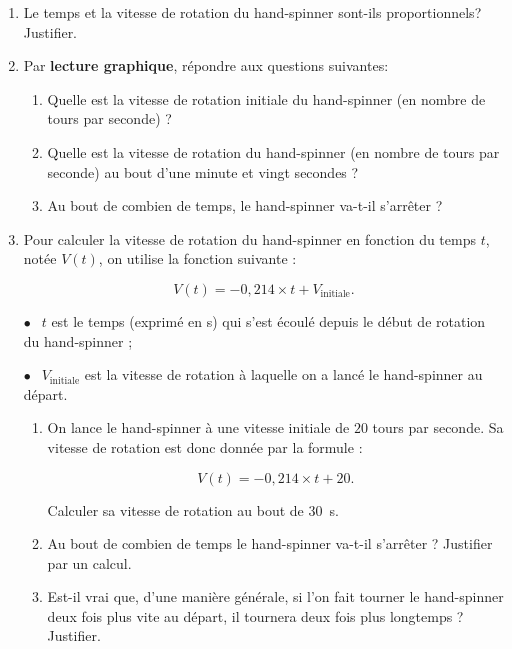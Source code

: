 \begin{enumerate}
\item Le temps et la vitesse de rotation du \og hand-spinner \fg{} sont-ils proportionnels? Justifier.
\item Par \textbf{lecture graphique}, répondre aux questions suivantes:
	\begin{enumerate}
		\item Quelle est la vitesse de rotation initiale du \og hand-spinner \fg{} (en nombre de tours par seconde) ?
		\item Quelle est la vitesse de rotation du \og hand-spinner \fg{} (en nombre de tours par seconde) au bout d'une minute et vingt secondes ?
		\item Au bout de combien de temps, le \og hand-spinner \fg{} va-t-il s'arrêter ?
	\end{enumerate}
\item  Pour calculer la vitesse de rotation du \og hand-spinner \fg{} en fonction du temps $t$, notée $V(t)$, on utilise la fonction suivante :
	
\[V(t) = - 0,214 \times t + V_{\text{initiale}}.\]
	
$\bullet~~$ $t$ est le temps (exprimé en s) qui s'est écoulé depuis le début de rotation du \og hand-spinner \fg{} ;
	
$\bullet~~$ $V_{\text{initiale}}$ est la vitesse de rotation à laquelle on a lancé le \og hand-spinner \fg{} au départ.
	\begin{enumerate}
		\item On lance le \og hand-spinner \fg{} à une vitesse initiale de $20$ tours par seconde. Sa vitesse de rotation est donc donnée par la formule : 
		
		\[V(t) = - 0,214 \times t + 20.\]
		
Calculer sa vitesse de rotation au bout de $30$~s.
		\item Au bout de combien de temps le hand-spinner va-t-il s'arrêter ? Justifier par un calcul.
		\item Est-il vrai que, d'une manière générale, si l'on fait tourner le hand-spinner deux fois plus vite au départ, il tournera deux fois plus longtemps ? Justifier.
	\end{enumerate}
 \end{enumerate}


